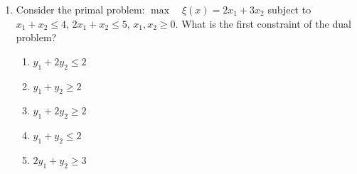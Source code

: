 \documentclass{article}%
\begin{document}
\begin{enumerate}
\begin{enumerate}
\item $y_1 + y_2$%
\item $y_1 + 2y_2$%
\item $3y_1 + 4y_2$%
\item $6y_1 + 5y_2$%
\end{enumerate}%
\vspace{1em}%
\item Consider the primal problem: $\max \quad \xi(x) = 2x_1 + 3x_2$ subject to $x_1 + x_2 \le 4$, $2x_1 + x_2 \le 5$, $x_1, x_2 \ge 0$. What is the first constraint of the dual problem?%
\begin{enumerate}%
\item $y_1 + 2y_2 \le 2$%
\item $y_1 + y_2 \ge 2$%
\item $y_1 + 2y_2 \ge 2$%
\item $y_1 + y_2 \le 2$%
\item $2y_1 + y_2 \ge 3$%
\end{enumerate}%
\vspace{1em}%
\end{enumerate}

%
\newpage%
\end{document}
